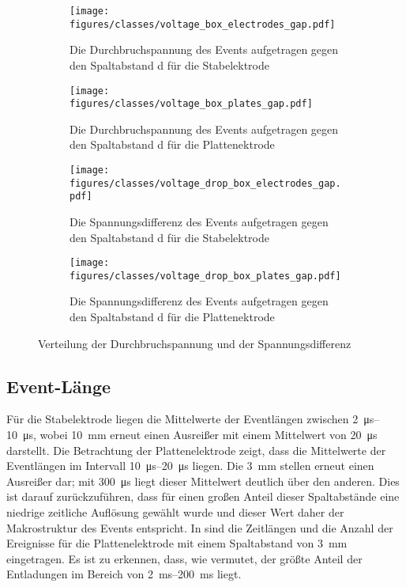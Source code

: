 \begin{figure}[H]
  \centering
  \begin{subfigure}[t]{0.48\textwidth}
    \centering
    \texttt{[image: figures/classes/voltage\_box\_electrodes\_gap.pdf]}
    \caption{Die Durchbruchspannung des Events aufgetragen gegen den Spaltabstand d für die Stabelektrode}
    \label{fig:box-gap-event-voltage-stab}
  \end{subfigure}
  \begin{subfigure}[t]{0.48\textwidth}
    \centering
    \texttt{[image: figures/classes/voltage\_box\_plates\_gap.pdf]}
    \caption{Die Durchbruchspannung des Events aufgetragen gegen den Spaltabstand d für die Plattenektrode}
    \label{fig:box-gap-event-voltage-plate}
  \end{subfigure}
  \centering
  \begin{subfigure}[t]{0.48\textwidth}
    \centering
    \texttt{[image: figures/classes/voltage\_drop\_box\_electrodes\_gap.pdf]}
    \caption{Die Spannungsdifferenz des Events aufgetragen gegen den Spaltabstand d für die Stabelektrode}
    \label{fig:box-gap-event-voltage-diff-stab}
  \end{subfigure}
  \begin{subfigure}[t]{0.48\textwidth}
    \centering
    \texttt{[image: figures/classes/voltage\_drop\_box\_plates\_gap.pdf]}
    \caption{Die Spannungsdifferenz des Events aufgetragen gegen den Spaltabstand d für die Plattenektrode}
    \label{fig:box-gap-event-voltage-diff-plate}
  \end{subfigure}
  \caption{Verteilung der Durchbruchspannung und der Spannungsdifferenz}
  \label{fig:box-gap-event-voltage-voltage-diff}
\end{figure}


\subsection{Event-Länge}
Für die Stabelektrode liegen die Mittelwerte der Eventlängen zwischen \SIrange{2}{10}{\micro\second}, wobei \SI{10}{\milli\meter} erneut einen Ausreißer mit einem Mittelwert von \SI{20}{\micro\second} darstellt. Die Betrachtung der Plattenelektrode  zeigt, dass die Mittelwerte der Eventlängen im Intervall \SIrange{10}{20}{\micro\second} liegen. Die \SI{3}{\milli\meter} stellen erneut einen Ausreißer dar; mit \SI{300}{\micro\second} liegt dieser Mittelwert deutlich über den anderen. Dies ist darauf zurückzuführen, dass für einen großen Anteil dieser Spaltabstände eine niedrige zeitliche Auflösung gewählt wurde und dieser Wert daher der Makrostruktur des Events entspricht. In  sind die Zeitlängen und die Anzahl der Ereignisse für die Plattenelektrode mit einem Spaltabstand von \SI{3}{\milli\meter} eingetragen. Es ist zu erkennen, dass, wie vermutet, der größte Anteil der Entladungen im Bereich von \SIrange{2}{200}{\milli\second} liegt.

